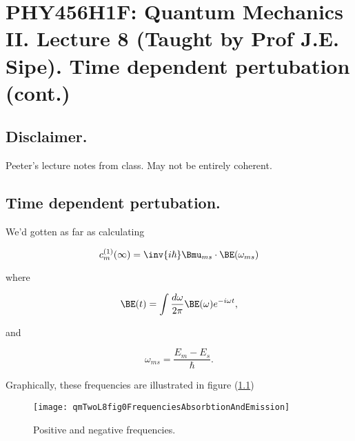 
%

%
%

\chapter{PHY456H1F: Quantum Mechanics II.  Lecture 8 (Taught by Prof J.E. Sipe).  Time dependent pertubation (cont.)}
\label{chap:qmTwoL8}
{}
\date{Oct 3, 2011}

\beginArtWithToc

\section{Disclaimer.}

Peeter's lecture notes from class.  May not be entirely coherent.

\section{Time dependent pertubation.}

We'd gotten as far as calculating

\begin{equation}\label{eqn:qmTwoL8:10}
c_m^{(1)}(\infty) = \inv{i \hbar} \Bmu_{ms} \cdot \BE(\omega_{ms})
\end{equation}

where

\begin{equation}\label{eqn:qmTwoL8:30}
\BE(t) = \int \frac{d\omega}{2 \pi} \BE(\omega) e^{-i \omega t},
\end{equation}

and

\begin{equation}\label{eqn:qmTwoL8:50}
\omega_{ms} = \frac{E_m - E_s}{\hbar}.
\end{equation}

Graphically, these frequencies are illustrated in figure (\ref{fig:qmTwoL8fig0FrequenciesAbsorbtionAndEmission})
%
\begin{figure}[htp]
\centering
\texttt{[image: qmTwoL8fig0FrequenciesAbsorbtionAndEmission]}
\caption{Positive and negative frequencies.}\label{fig:qmTwoL8fig0FrequenciesAbsorbtionAndEmission}
\end{figure}

